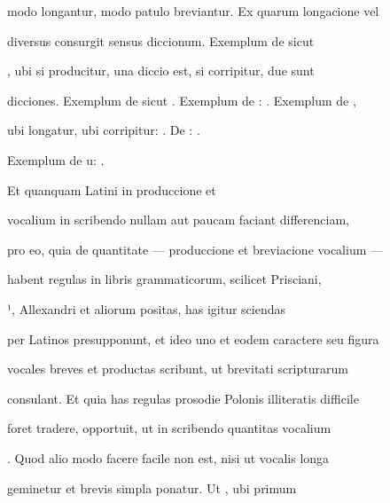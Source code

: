\fulllines{}

modo longantur, modo patulo breviantur. Ex quarum longacione vel 

 diversus consurgit sensus diccionum. Exemplum de  sicut 

, ubi si  producitur, una diccio est, si corripitur, due sunt

dicciones. Exemplum de  sicut  . Exemplum de :  . Exemplum de ,

ubi longatur, ubi corripitur:  . De :  .

\splitlines{}

Exemplum de u:  .

\indentK Et quanquam Latini in produccione et 

\fulllines{}

 vocalium in scribendo nullam aut paucam faciant differenciam,

pro eo, quia de quantitate — produccione et breviacione vocalium — 

 habent regulas in libris grammaticorum, scilicet Prisciani,


¹, Allexandri et aliorum positas, has igitur sciendas

per Latinos presupponunt, et ideo uno et eodem caractere seu figura

vocales breves et productas scribunt, ut brevitati scripturarum

consulant. Et quia has regulas prosodie Polonis illiteratis difficile

foret tradere, opportuit, ut in scribendo quantitas vocalium 

. Quod alio modo facere facile non est, nisi ut vocalis longa

geminetur et brevis simpla ponatur. Ut , ubi primum 

